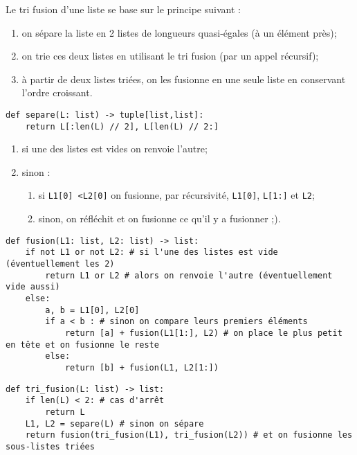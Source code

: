 
Le tri fusion d'une liste se base sur le principe suivant : 
\begin{enumerate}
\item on sépare la liste en 2 listes de longueurs quasi-égales (à un élément près);
\item on trie ces deux listes en utilisant le tri fusion (par un appel récursif);
\item à partir de deux listes triées, on les fusionne en une seule liste en conservant l'ordre croissant.
\end{enumerate}

\ifprof
\begin{lstlisting}
def separe(L: list) -> tuple[list,list]:
    return L[:len(L) // 2], L[len(L) // 2:]
\end{lstlisting}
\else
\fi


\itshape
\begin{enumerate}
\item si une des listes est vides on renvoie l'autre;
\item sinon : 
\begin{enumerate}
\item si \texttt{L1[0] <L2[0]} on fusionne, par récursivité, \texttt{L1[0]}, \texttt{L[1:]} et \texttt{L2};
\item sinon, on réfléchit et on fusionne ce qu'il y a fusionner ;).
\end{enumerate}
\end{enumerate}
\normalshape

\ifprof
\begin{lstlisting}
def fusion(L1: list, L2: list) -> list:
    if not L1 or not L2: # si l'une des listes est vide (éventuellement les 2)
        return L1 or L2 # alors on renvoie l'autre (éventuellement vide aussi)
    else:
        a, b = L1[0], L2[0] 
        if a < b : # sinon on compare leurs premiers éléments
            return [a] + fusion(L1[1:], L2) # on place le plus petit en tête et on fusionne le reste
        else:
            return [b] + fusion(L1, L2[1:])
\end{lstlisting}
\else
\fi




\ifprof
\begin{lstlisting}
def tri_fusion(L: list) -> list:
    if len(L) < 2: # cas d'arrêt
        return L
    L1, L2 = separe(L) # sinon on sépare
    return fusion(tri_fusion(L1), tri_fusion(L2)) # et on fusionne les sous-listes triées
\end{lstlisting}
\else
\fi
